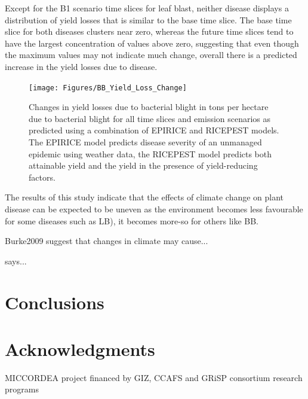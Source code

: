 \documentclass[preprint,12pt]{elsarticle}
\begin{document}
Except for the B1 scenario time slices for leaf blast, neither disease displays a distribution of yield losses that is similar to the base time slice. The base time slice for both diseases clusters near zero, whereas the future time slices tend to have the largest concentration of values above zero, suggesting that even though the maximum values may not indicate much change, overall there is a predicted increase in the yield losses due to disease.

\begin{figure}[H]
  \texttt{[image: Figures/BB\_Yield\_Loss\_Change]}
  \caption{Changes in yield losses due to bacterial blight  in tons per hectare due to bacterial blight for all time slices and emission scenarios as predicted using a combination of EPIRICE and RICEPEST models. The EPIRICE model predicts disease severity of an unmanaged epidemic using weather data, the RICEPEST model predicts both attainable yield and the yield in the presence of yield-reducing factors.}
  \label{BB_Change_Map}
\end{figure}

The results of this study indicate that the effects of climate change on plant disease can be expected to be uneven as the environment becomes less favourable for some diseases such as LB), it becomes more-so for others like BB. 

{Burke2009} suggest that changes in climate may cause...

\citet{Thornton2009} says...

\section{Conclusions}

\section{Acknowledgments}
MICCORDEA project financed by GIZ, CCAFS and GRiSP consortium research programs





\end{document}
